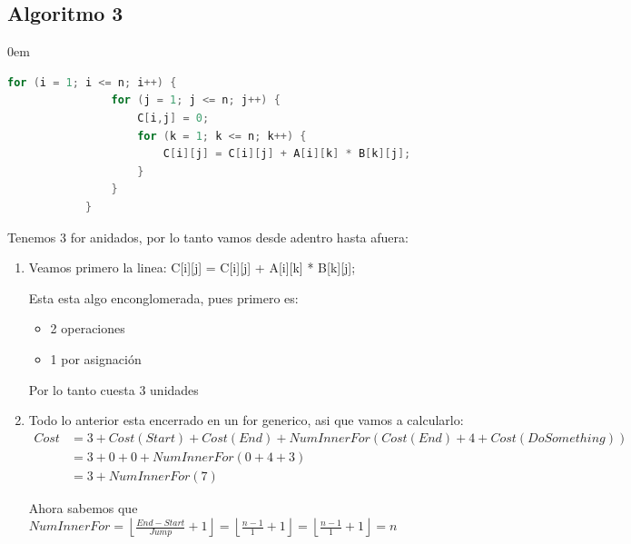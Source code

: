 \documentclass[12pt, fleqn]{article}                            %
\newenvironment{SmallIndentation}[1][0.75em]                    %
        {\begin{adjustwidth}{#1}{}\begin{footnotesize}}             %
        {\end{footnotesize}\end{adjustwidth}}                       %
\theoremstyle{break}                                            %
\newcommand{\Floor}[1]{\left \lfloor #1 \right \rfloor}         %
\begin{document}
    \subsection{Algoritmo 3}
    \begin{SmallIndentation}[0em]
            
        \begin{lstlisting}[language=C, gobble=12, basicstyle=\small\color{white}]
            for (i = 1; i <= n; i++) {
                for (j = 1; j <= n; j++) {
                    C[i,j] = 0;                             
                    for (k = 1; k <= n; k++) {
                        C[i][j] = C[i][j] + A[i][k] * B[k][j];    
                    }
                }
            }
        \end{lstlisting} 

        Tenemos 3 for anidados, por lo tanto vamos desde adentro hasta afuera:  
        \begin{enumerate}
            \item
                Veamos primero la linea: C[i][j] = C[i][j] + A[i][k] * B[k][j];   

                Esta esta algo enconglomerada, pues primero es:
                \begin{itemize}
                    \item 2 operaciones
                    \item 1 por asignación
                \end{itemize}

                Por lo tanto cuesta 3 unidades


            \item Todo lo anterior esta encerrado en un for generico, 
                asi que vamos a calcularlo:
                \begin{align*}
                    Cost 
                        &= 3 + Cost(Start) + Cost(End) + NumInnerFor(Cost(End) + 4 + Cost(DoSomething))     \\
                        &= 3 + 0 + 0 + NumInnerFor(0 + 4 + 3)     \\
                        &= 3 + NumInnerFor(7)
                \end{align*}

                Ahora sabemos que 
                $NumInnerFor 
                    = \Floor{\frac{End - Start}{Jump} + 1}
                    = \Floor{\frac{n - 1}{1} + 1}
                    = \Floor{\frac{n-1}{1} + 1}
                    = n$


\end{enumerate}
\end{SmallIndentation}
\end{document}
